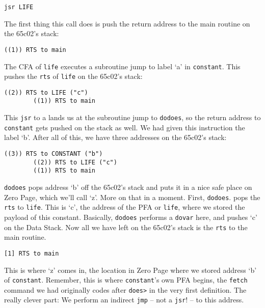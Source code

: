 \begin{lstlisting}[frame=single]
        jsr LIFE
\end{lstlisting}

The first thing this call does is push the return address to the main routine
on the 65c02's stack: 

\begin{lstlisting}[frame=single]
        ((1)) RTS to main
\end{lstlisting}

The CFA of \texttt{life} executes a subroutine jump to label `a' in
\texttt{constant}. This pushes the \texttt{rts} of \texttt{life} on the 65c02's
stack:

\begin{lstlisting}[frame=single]
        ((2)) RTS to LIFE ("c")
        ((1)) RTS to main
\end{lstlisting}

This \texttt{jsr} to a lands us at the subroutine jump to \texttt{dodoes}, so
the return address to \texttt{constant} gets pushed on the stack as well. We had
given this instruction the label `b'. After all of this, we have three addresses
on the 65c02's stack: 

\begin{lstlisting}[frame=single]
        ((3)) RTS to CONSTANT ("b") 
        ((2)) RTS to LIFE ("c") 
        ((1)) RTS to main
\end{lstlisting}

\texttt{dodoes} pops address `b' off the 65c02's stack and puts it in a nice
safe place on Zero Page, which we'll call `z'. More on that in a moment. First,
\texttt{dodoes}.  pops the \texttt{rts} to \texttt{life}. This is `c', the
address of the PFA or \texttt{life}, where we stored the payload of this
constant. Basically, \texttt{dodoes} performs a \texttt{dovar} here, and
pushes `c' on the Data Stack. Now all we have left on the 65c02's stack is the
\texttt{rts} to the main routine.  
 
\begin{lstlisting}[frame=single]
        [1] RTS to main
\end{lstlisting}

This is where `z' comes in, the location in Zero Page where we stored address
`b' of \texttt{constant}. Remember, this is where \texttt{constant}'s own PFA
begins, the \texttt{fetch} command we had originally codes after \texttt{does>}
in the very first definition. The really clever part: We perform an indirect
\texttt{jmp} -- not a \texttt{jsr}! -- to this address.

